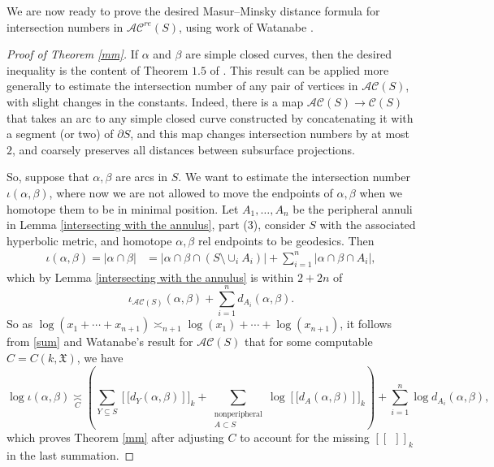 \documentclass[11pt]{amsart}
\theoremstyle{remark}
\numberwithin{equation}{section}
\newcommand{\cAC}{\mathcal{AC}}
\newcommand{\acre}{\cAC^{re}}
\begin{document}
 We are now ready to prove  the desired Masur--Minsky  distance formula for intersection numbers in $\acre(S)$, using work of Watanabe \cite{Watanabe}.

\begin{proof}[Proof of Theorem \ref{mm}]
If $\alpha$ and $\beta$ are simple closed curves, then the desired inequality is the content of Theorem $1.5$ of \cite{Watanabe}.  This result can be applied more generally to estimate the intersection number of  any pair of vertices in $\mathcal{AC}(S)$, with slight changes in the constants. Indeed, there is a map $\mathcal{AC}(S)\longrightarrow \mathcal{C}(S)$ that takes an arc to any simple closed curve constructed by concatenating it with a segment (or two) of $\partial S$, and this map changes intersection numbers by at most $2$, and coarsely preserves all distances between subsurface projections.

So, suppose that $\alpha,\beta$ are arcs in $S$.  We want to estimate the intersection number $\iota(\alpha,\beta)$, where now we are not allowed to move the endpoints of $\alpha,\beta$  when we homotope them to be in minimal position. Let $A_1,\ldots,A_n$  be the peripheral annuli in Lemma \ref{intersecting with the annulus}, part (3), consider $S $ with the associated hyperbolic metric, and homotope $\alpha,\beta$ rel endpoints to be geodesics. Then 
\begin{align*}
	\iota(\alpha,\beta)  = | \alpha \cap \beta | & = |\alpha  \cap \beta \cap (S \setminus \cup_i A_i)| + \sum_{i=1}^n | \alpha \cap \beta \cap A_i |,
\end{align*}
 which by Lemma \ref{intersecting with the annulus}  is within $2+2n$ of 
 \begin{equation}\iota_{\mathcal {AC}(S)}(\alpha,\beta) +\sum_{i=1}^n d_{A_i}(\alpha,\beta).\label{sum}\end{equation}
So as $\log (x_1+\cdots + x_{n+1}) \asymp_{n+1} \log(x_1) +\cdots + \log(x_{n+1})$, it follows from \eqref{sum} and Watanabe's result for $\mathcal {AC}(S)$ that for some computable $C=C(k,\mathfrak X)$, we have
$$
\log \iota( \alpha ,  \beta) \underset{C}{\asymp} \left(  
\sum_{Y\subseteq S}  \left[[ d_Y( \alpha, \beta) \right]]_k +
\sum_{\substack{\text{nonperipheral} \\ A\subset S}} \log  \left[[ d_A( \alpha, \beta) \right]]_k  \right) + \sum_{i=1}^n \log d_{A_i}(\alpha,\beta),
$$
which proves Theorem \ref{mm} after adjusting $C$ to account for the missing $[[ \ \  ]]_k$ in the last summation. \end{proof}
\end{document}
